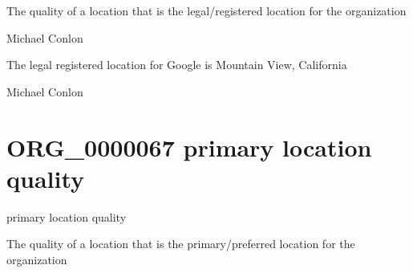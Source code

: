 \documentclass[letterpaper,10pt,english]{sphinxmanual}
\begin{document}
\begin{sphinxShadowBox}

\sphinxAtStartPar
The quality of a location that is the legal/registered location for the organization
\end{sphinxShadowBox}

\begin{sphinxShadowBox}

\sphinxAtStartPar
Michael Conlon 
\end{sphinxShadowBox}

\begin{sphinxShadowBox}

\sphinxAtStartPar
The legal registered location for Google is Mountain View, California
\end{sphinxShadowBox}

\begin{sphinxShadowBox}

\sphinxAtStartPar
Michael Conlon 
\end{sphinxShadowBox}
\begin{quote}
\label{\detokenize{doc-ORG_0000067:org-0000067}}\label{\detokenize{doc-ORG_0000067:primary-location-quality}}\label{\detokenize{doc-ORG_0000067:org-0000067}}
\ignorespaces \end{quote}


\section{ORG\_0000067 \sphinxhyphen{} primary location quality}
\label{\detokenize{doc-ORG_0000067:org-0000067-primary-location-quality}}\label{\detokenize{doc-ORG_0000067:index-0}}\label{\detokenize{doc-ORG_0000067::doc}}
\begin{sphinxShadowBox}

\sphinxAtStartPar
primary location quality
\end{sphinxShadowBox}

\begin{sphinxShadowBox}

\sphinxAtStartPar
The quality of a location that is the primary/preferred location for the organization
\end{sphinxShadowBox}
\end{document}
